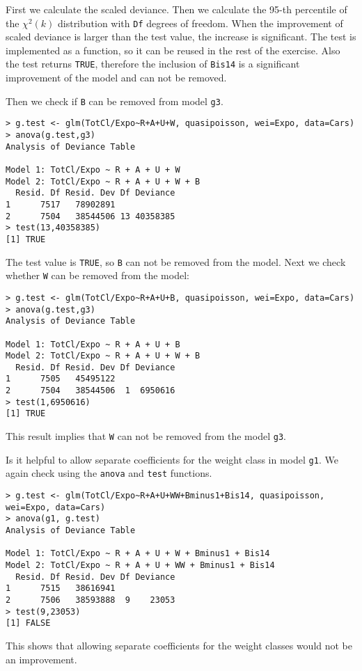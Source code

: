 \documentclass[11pt]{article}
\begin{document}
First we calculate the scaled deviance. Then we calculate the 95-th percentile of the $\chi^{2}(k)$ distribution with \verb|Df| degrees of freedom. When the improvement of scaled deviance is larger than the test value, the increase is significant. The test is implemented as a function, so it can be reused in the rest of the exercise. Also the test returns \verb|TRUE|, therefore the inclusion of \verb|Bis14| is a significant improvement of the model and can not be removed.

Then we check if \verb|B| can be removed from model \verb|g3|.

\begin{verbatim}
> g.test <- glm(TotCl/Expo~R+A+U+W, quasipoisson, wei=Expo, data=Cars)
> anova(g.test,g3)
Analysis of Deviance Table

Model 1: TotCl/Expo ~ R + A + U + W
Model 2: TotCl/Expo ~ R + A + U + W + B
  Resid. Df Resid. Dev Df Deviance
1      7517   78902891            
2      7504   38544506 13 40358385
> test(13,40358385)
[1] TRUE
\end{verbatim}

The test value is \verb|TRUE|, so \verb|B| can not be removed from the model. Next we check whether \verb|W| can be removed from the model:

\begin{verbatim}
> g.test <- glm(TotCl/Expo~R+A+U+B, quasipoisson, wei=Expo, data=Cars)
> anova(g.test,g3)
Analysis of Deviance Table

Model 1: TotCl/Expo ~ R + A + U + B
Model 2: TotCl/Expo ~ R + A + U + W + B
  Resid. Df Resid. Dev Df Deviance
1      7505   45495122            
2      7504   38544506  1  6950616
> test(1,6950616)
[1] TRUE
\end{verbatim}

This result implies that \verb|W| can not be removed from the model \verb|g3|.

Is it helpful to allow separate coefficients for the weight class in model \verb|g1|. We again check using the \verb|anova| and \verb|test| functions.

\begin{verbatim}
> g.test <- glm(TotCl/Expo~R+A+U+WW+Bminus1+Bis14, quasipoisson, wei=Expo, data=Cars)
> anova(g1, g.test)
Analysis of Deviance Table

Model 1: TotCl/Expo ~ R + A + U + W + Bminus1 + Bis14
Model 2: TotCl/Expo ~ R + A + U + WW + Bminus1 + Bis14
  Resid. Df Resid. Dev Df Deviance
1      7515   38616941            
2      7506   38593888  9    23053
> test(9,23053)
[1] FALSE
\end{verbatim}

This shows that allowing separate coefficients for the weight classes would not be an improvement.
\end{document}
